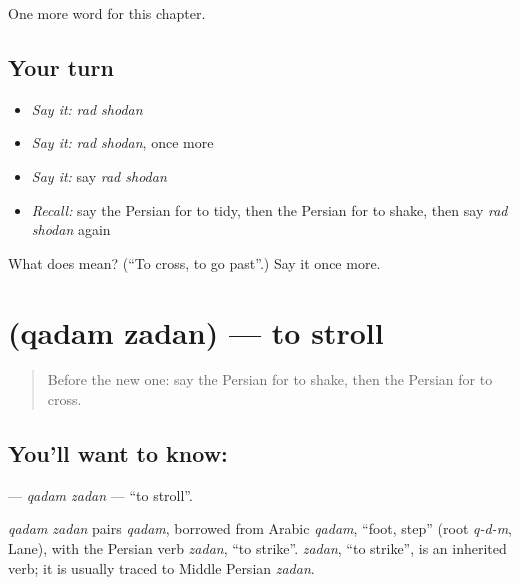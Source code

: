 \begin{grammarlens}[title={What you've built}]
One more word for this chapter.
\end{grammarlens}

\subsection*{Your turn}
\begin{itemize}
\raggedright
  \item \emph{Say it:} \emph{rad shodan}
  \item \emph{Say it:} \emph{rad shodan}, once more
  \item \emph{Say it:} say \emph{rad shodan}
  \item \emph{Recall:} say the Persian for to tidy, then the Persian for to shake, then say \emph{rad shodan} again
\end{itemize}

\begin{tcolorbox}[breakable,colback=teal!4,colframe=teal!35!black,title={Before you move on}]
What does   mean? (\textquotedblleft{}To cross, to go past\textquotedblright{}.) Say it once more.
\end{tcolorbox}
\section[\texorpdfstring{\fa{قدم} \fa{زدن} (qadam zadan)}{قدم زدن (qadam zadan)}]{  (qadam zadan) — to stroll}

\label{lesson:FA-C181-qadam-zadan}



\begin{quote}
Before the new one: say the Persian for to shake, then the Persian for to cross.
\end{quote}

\subsection*{You'll want to know:  }
\textbf{ } — \emph{qadam zadan} — \textquotedblleft{}to stroll\textquotedblright{}.

\begin{cousinweb}
\emph{qadam zadan} pairs \emph{qadam}, borrowed from Arabic \emph{qadam}, \textquotedblleft{}foot, step\textquotedblright{} (root \emph{q-d-m}, Lane), with the Persian verb \emph{zadan}, \textquotedblleft{}to strike\textquotedblright{}. \emph{zadan}, \textquotedblleft{}to strike\textquotedblright{}, is an inherited verb; it is usually traced to Middle Persian \emph{zadan}.
\end{cousinweb}

